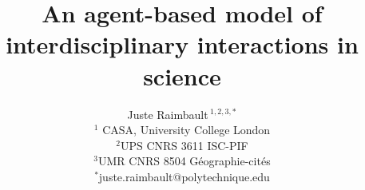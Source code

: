 \documentclass[utf8,11pt]{article}
\makeatletter
\def\firstAuthorLast{Raimbault} %
\def\Authors{Juste Raimbault\,$^{1,2,3,\ast}$}
\def\Address{$^{1}$ CASA, University College London\\%
$^{2}$UPS CNRS 3611 ISC-PIF\\%
$^{3}$UMR CNRS 8504 G{\'e}ographie-cit{\'e}s}
\def\corrEmail{$^{\ast}$juste.raimbault@polytechnique.edu}
\makeatother
\begin{document}

\title{\vspace{-3cm}An agent-based model of interdisciplinary interactions in science} 

\author{
\Authors\medskip\\
\Address\medskip\\
\corrEmail
} %

\date{}

\maketitle
\end{document}
